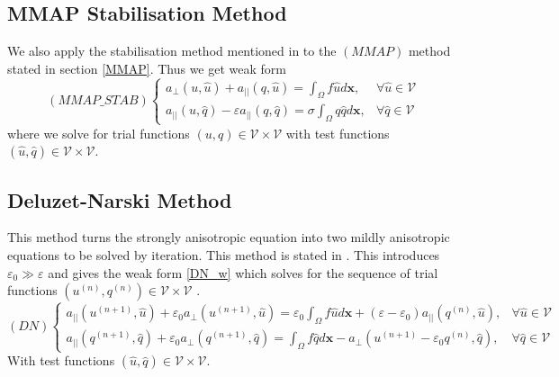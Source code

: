 \documentclass[12pt]{ociamthesis}
\begin{document}
\subsection{MMAP Stabilisation Method} \label{MMAP_STAB}
We also apply the stabilisation method mentioned in \cite{STAB} to the $(MMAP)$ method stated in section \ref{MMAP}. Thus we get weak form
\begin{equation} \label{MMAP_STAB_w}
(MMAP\_STAB)
\begin{cases}
a_{\perp}(u, \hat{u}) + a_{||}(q, \hat{u}) = \int_{\Omega} f \hat{u} d\mathbf{x}, 
&\forall \hat{u} \in \mathcal{V}\\
a_{||}(u, \hat{q}) - \varepsilon a_{||}(q, \hat{q}) = \sigma \int_{\Omega} q \hat{q} d\mathbf{x}, & \forall \hat{q}\in \mathcal{V}
\end{cases}
\end{equation}
where we solve for trial functions $(u,q) \in \mathcal{V} \times \mathcal{V}$ with test functions $(\hat{u}, \hat{q}) \in \mathcal{V} \times \mathcal{V}$. 

\subsection{Deluzet-Narski Method} \label{DN}
This method turns the strongly anisotropic equation into two mildly anisotropic equations to be solved by iteration. This method is stated in \cite{DN}. This introduces $\varepsilon_0 \gg \varepsilon$ and gives the weak form \ref{DN_w} which solves for the sequence of trial functions $(u^{(n)}, q^{(n)}) \in \mathcal{V} \times \mathcal{V}$ .
 \begin{equation} \label{DN_w}
 (DN)
   \begin{cases}
  a_{||}(u^{(n+1)}, \hat{u}) + \varepsilon_0 a_{\perp}(u^{(n+1)}, \hat{u}) = 
  \varepsilon_0 \int_{\Omega} f \hat{u} d\mathbf{x}
  +(\varepsilon-\varepsilon_0)a_{||}(q^{(n)}, \hat{u}),
  & \forall \hat{u} \in \mathcal{V}\\
  a_{||}(q^{(n+1)}, \hat{q}) + \varepsilon_0 a_{\perp}(q^{(n+1)}, \hat{q}) = 
  \int_{\Omega} f \hat{q} d\mathbf{x}
  -a_{\perp}(u^{(n+1)} - \varepsilon_0 q^{(n)}, \hat{q}),
  & \forall \hat{q} \in \mathcal{V}
  \end{cases}
  \end{equation}
With test functions $(\hat{u}, \hat{q}) \in \mathcal{V} \times \mathcal{V}$.
\end{document}
